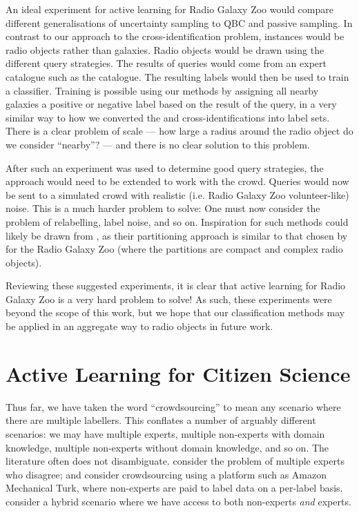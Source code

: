     An ideal experiment for active learning for Radio Galaxy Zoo would compare
    different generalisations of uncertainty sampling to QBC and passive
    sampling. In contrast to our approach to the cross-identification problem,
    instances would be radio objects rather than galaxies. Radio objects would
    be drawn using the different query strategies. The results of queries would
    come from an expert catalogue such as the \citeauthor{norris06} catalogue.
    The resulting labels would then be used to train a classifier. Training is
    possible using our methods by assigning all nearby galaxies a positive or
    negative label based on the result of the query, in a very similar way to
    how we converted the \citeauthor{norris06} and \citeauthor{fan15}
    cross-identifications into label sets. There is a clear problem of scale ---
    how large a radius around the radio object do we consider ``nearby''? ---
    and there is no clear solution to this problem.

    After such an experiment was used to determine good query strategies, the
    approach would need to be extended to work with the crowd. Queries would now
    be sent to a simulated crowd with realistic (i.e. Radio Galaxy Zoo
    volunteer-like) noise. This is a much harder problem to solve: One must now
    consider the problem of relabelling, label noise, and so on. Inspiration for
    such methods could likely be drawn from \citet{mozafari12}, as their
    partitioning approach is similar to that chosen by \citet{banfield15} for
    the Radio Galaxy Zoo (where the partitions are compact and complex radio
    objects).

    Reviewing these suggested experiments, it is clear that active learning for
    Radio Galaxy Zoo is a very hard problem to solve! As such, these experiments
    were beyond the scope of this work, but we hope that our classification
    methods may be applied in an aggregate way to radio objects in future work.

\section{Active Learning for Citizen Science}
\label{sec:al-citizen-science}
    
    Thus far, we have taken the word ``crowdsourcing'' to mean any scenario
    where there are multiple labellers. This conflates a number of arguably
    different scenarios: we may have multiple experts, multiple non-experts with
    domain knowledge, multiple non-experts without domain knowledge, and so on.
    The literature often does not disambiguate. \citet{raykar10} consider the
    problem of multiple experts who disagree; \citet{yan10} and
    \citet{mozafari12} consider crowdsourcing using a platform such as Amazon
    Mechanical Turk, where non-experts are paid to label data on a per-label
    basis. \citet{nguyen15} consider a hybrid scenario where we have access to
    both non-experts \emph{and} experts.

